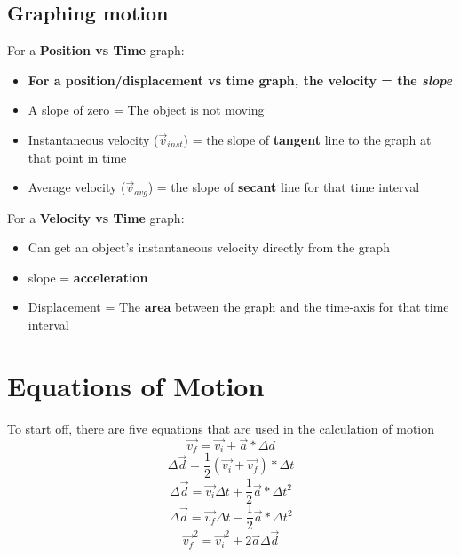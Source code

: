 \documentclass[11pt]{report}
\theoremstyle{remark}
\begin{document}
\subsection{Graphing motion}
For a \textbf{Position vs Time} graph:
\begin{itemize}
\item \textbf{For a position/displacement vs time graph, the velocity = the \textit{slope}} 
\item A slope of zero = The object is not moving
\item Instantaneous velocity ($\vec{v}_{inst}$) = the slope of \textbf{tangent} line to the graph at that point in time
\item Average velocity ($\vec{v}_{avg}$) = the slope of \textbf{secant} line for that time interval
\end{itemize}
For a \textbf{Velocity vs Time} graph:
\begin{itemize}
    \item Can get an object's instantaneous velocity directly from the graph
    \item slope = \textbf{acceleration}
    \item Displacement = The \textbf{area} between the graph and the time-axis for that time interval
\end{itemize}

\newpage
\section{Equations of Motion}
To start off, there are five equations that are used in the calculation of motion
\[
    \vec{v_{f}} = \vec{v_{i}} + \vec{a}*\Delta d
\]
\[
    \Delta\vec{d} = \frac{1}{2}(\vec{v_{i}} + \vec{v_{f}}) * \Delta t
\]
\[
    \Delta\vec{d} = \vec{v_{i}}\Delta t + \frac{1}{2}\vec{a} * \Delta t^2
\]
\[
    \Delta\vec{d} = \vec{v_{f}}\Delta t - \frac{1}{2}\vec{a} * \Delta t^2
\]
\[
    \vec{v_{f}}^2 = \vec{v_{i}}^2 + 2 \vec{a} \Delta \vec{d} 
\]
\end{document}
